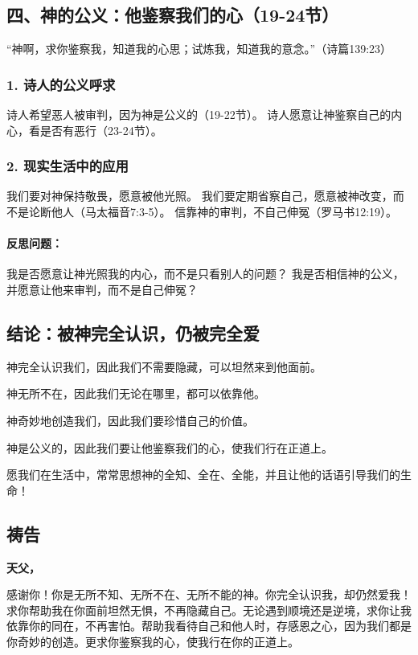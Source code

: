 \documentclass[a4paper, 12pt]{article}
\begin{document}
\subsection*{四、神的公义：他鉴察我们的心（19-24节）}
“神啊，求你鉴察我，知道我的心思；试炼我，知道我的意念。”（诗篇139:23）

\subsubsection*{1. 诗人的公义呼求}
诗人希望恶人被审判，因为神是公义的（19-22节）。
诗人愿意让神鉴察自己的内心，看是否有恶行（23-24节）。
\subsubsection*{2. 现实生活中的应用}
我们要对神保持敬畏，愿意被他光照。
我们要定期省察自己，愿意被神改变，而不是论断他人（马太福音7:3-5）。
信靠神的审判，不自己伸冤（罗马书12:19）。
\paragraph*{反思问题：}

我是否愿意让神光照我的内心，而不是只看别人的问题？
我是否相信神的公义，并愿意让他来审判，而不是自己伸冤？
\subsection*{结论：被神完全认识，仍被完全爱}

\hspace{0.6cm}神完全认识我们，因此我们不需要隐藏，可以坦然来到他面前。

神无所不在，因此我们无论在哪里，都可以依靠他。

神奇妙地创造我们，因此我们要珍惜自己的价值。

神是公义的，因此我们要让他鉴察我们的心，使我们行在正道上。

愿我们在生活中，常常思想神的全知、全在、全能，并且让他的话语引导我们的生命！

\subsection*{祷告}
\textbf{天父，}

感谢你！你是无所不知、无所不在、无所不能的神。你完全认识我，却仍然爱我！求你帮助我在你面前坦然无惧，不再隐藏自己。无论遇到顺境还是逆境，求你让我依靠你的同在，不再害怕。帮助我看待自己和他人时，存感恩之心，因为我们都是你奇妙的创造。更求你鉴察我的心，使我行在你的正道上。
\end{document}
